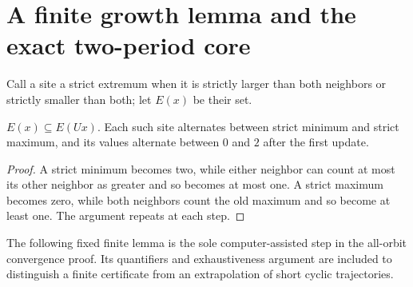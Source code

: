 \section{A finite growth lemma and the exact two-period core}

Call a site a strict extremum when it is strictly larger than both
neighbors or strictly smaller than both; let $E(x)$ be their set.

\begin{lemma}\label{lem:permanent}
 $E(x)\subseteq E(Ux)$. Each such site alternates between strict minimum
 and strict maximum, and its values alternate between $0$ and $2$ after
 the first update.
\end{lemma}
\begin{proof}
 A strict minimum becomes two, while either neighbor can count at most
 its other neighbor as greater and so becomes at most one. A strict
 maximum becomes zero, while both neighbors count the old maximum and
 so become at least one. The argument repeats at each step.
\end{proof}

The following fixed finite lemma is the sole computer-assisted step in
the all-orbit convergence proof. Its quantifiers and exhaustiveness
argument are included to distinguish a finite certificate from an
extrapolation of short cyclic trajectories.

